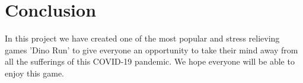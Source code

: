 \documentclass[a4paper]{article}
\begin{document}
 \section{Conclusion}
 In this project we have created one of the most popular and stress relieving games 'Dino Run' to give everyone an opportunity to take their mind away from all the sufferings of this COVID-19 pandemic. We hope everyone will be able to enjoy this game.
\end{document}
